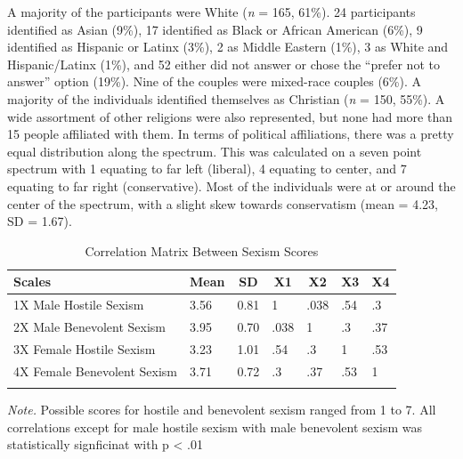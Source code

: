 \documentclass[
  man]{apa6}
\begin{document}
A majority of the participants were White (\emph{n} = 165, 61\%). 24 participants identified as Asian (9\%), 17 identified as Black or African American (6\%), 9 identified as Hispanic or Latinx (3\%), 2 as Middle Eastern (1\%), 3 as White and Hispanic/Latinx (1\%), and 52 either did not answer or chose the ``prefer not to answer'' option (19\%). Nine of the couples were mixed-race couples (6\%). A majority of the individuals identified themselves as Christian (\emph{n} = 150, 55\%). A wide assortment of other religions were also represented, but none had more than 15 people affiliated with them. In terms of political affiliations, there was a pretty equal distribution along the spectrum. This was calculated on a seven point spectrum with 1 equating to far left (liberal), 4 equating to center, and 7 equating to far right (conservative). Most of the individuals were at or around the center of the spectrum, with a slight skew towards conservatism (mean = 4.23, SD = 1.67).

\begin{table}[tbp]

\begin{center}
\begin{threeparttable}

\caption{\label{tab:unnamed-chunk-2}Correlation Matrix Between Sexism Scores}

\begin{tabular}{lllllll}
\toprule
Scales & \multicolumn{1}{c}{Mean} & \multicolumn{1}{c}{SD} & \multicolumn{1}{c}{X1} & \multicolumn{1}{c}{X2} & \multicolumn{1}{c}{X3} & \multicolumn{1}{c}{X4}\\
\midrule
1X Male Hostile Sexism & 3.56 & 0.81 & 1 & .038 & .54 & .3\\
2X Male Benevolent Sexism & 3.95 & 0.70 & .038 & 1 & .3 & .37\\
3X Female Hostile Sexism & 3.23 & 1.01 & .54 & .3 & 1 & .53\\
4X Female Benevolent Sexism & 3.71 & 0.72 & .3 & .37 & .53 & 1\\
\bottomrule
\addlinespace
\end{tabular}

\begin{tablenotes}[para]
\normalsize{\textit{Note.} Possible scores for hostile and benevolent sexism ranged from 1 to 7. All correlations except for male hostile sexism with male benevolent sexism was statistically signficinat with p < .01}
\end{tablenotes}

\end{threeparttable}
\end{center}

\end{table}
\end{document}
